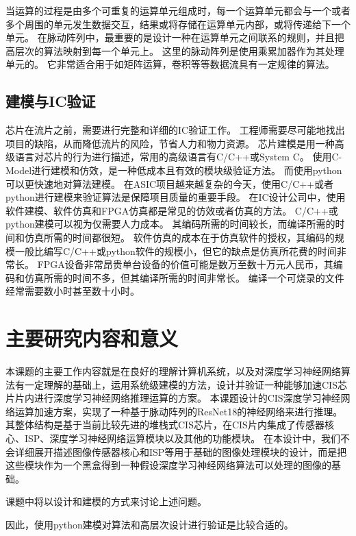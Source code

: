 当运算的过程是由多个可重复的运算单元组成时，每一个运算单元都会与一个或者多个周围的单元发生数据交互，结果或将存储在运算单元内部，或将传递给下一个单元。
在脉动阵列中，最重要的是设计一种在运算单元之间联系的规则，并且把高层次的算法映射到每一个单元上。
这里的脉动阵列是使用乘累加器作为其处理单元的。
它非常适合用于如矩阵运算，卷积等等数据流具有一定规律的算法。  





\subsection{建模与IC验证}
芯片在流片之前，需要进行完整和详细的IC验证工作。
工程师需要尽可能地找出项目的缺陷，从而降低流片的风险，节省人力和物力资源。
芯片建模是用一种高级语言对芯片的行为进行描述，常用的高级语言有C/C++或System C。
使用C-Model进行建模和仿效，是一种低成本且有效的模块级验证方法。
而使用python可以更快速地对算法建模。
在ASIC项目越来越复杂的今天，使用C/C++或者python进行建模来验证算法是保障项目质量的重要手段。
在IC设计公司中，使用软件建模、软件仿真和FPGA仿真都是常见的仿效或者仿真的方法。
C/C++或python建模可以视为仅需要人力成本。
其编码所需的时间较长，而编译所需的时间和仿真所需的时间都很短。
软件仿真的成本在于仿真软件的授权，其编码的规模一般比编写C/C++或python软件的规模小，但它的缺点是仿真所花费的时间非常长。
FPGA设备非常昂贵单台设备的价值可能是数万至数十万元人民币，其编码和仿真所需的时间不多，但其编译所需的时间非常长。
编译一个可烧录的文件经常需要数小时甚至数十小时。


\section{主要研究内容和意义}

本课题的主要工作内容就是在良好的理解计算机系统，以及对深度学习神经网络算法有一定理解的基础上，运用系统级建模的方法，设计并验证一种能够加速CIS芯片片内进行深度学习神经网络推理运算的方案。  
本课题设计的CIS深度学习神经网络运算加速方案，实现了一种基于脉动阵列的ResNet18的神经网络来进行推理。
其整体结构是基于当前比较先进的堆栈式CIS芯片，在CIS片内集成了传感器核心、ISP、深度学习神经网络运算模块以及其他的功能模块。
在本设计中，我们不会详细展开描述图像传感器核心和ISP等用于基础的图像处理模块的设计，而是把这些模块作为一个黑盒得到一种假设深度学习神经网络算法可以处理的图像的基础。  

课题中将以设计和建模的方式来讨论上述问题。

因此，使用python建模对算法和高层次设计进行验证是比较合适的。
